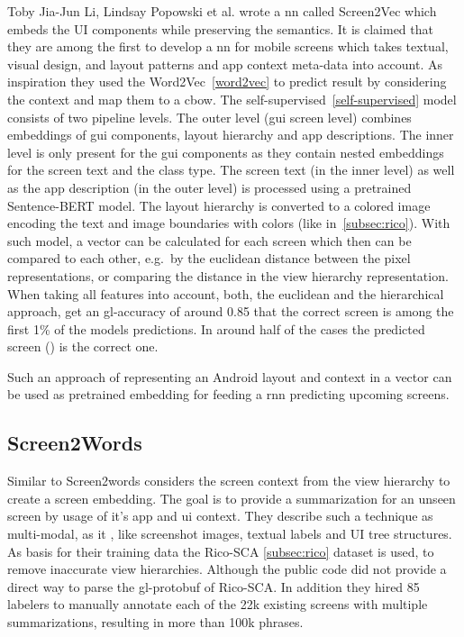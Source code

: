 Toby Jia-Jun Li, Lindsay Popowski et al. \cite{li2021screen2vec} wrote a \gls{nn} called Screen2Vec which embeds the UI components while preserving the semantics.
It is claimed that they are among the first to develop a \gls{nn} for mobile screens which takes textual, visual design, and layout patterns and app context meta-data into account.
As inspiration they used the Word2Vec~\ref{word2vec} to predict result by considering the context and map them to a \gls{cbow}.
The self-supervised~\ref{self-supervised} model consists of two pipeline levels.
The outer level (\gls{gui} screen level) combines embeddings of \gls{gui} components, layout hierarchy and app descriptions.
The inner level is only present for the \gls{gui} components as they contain nested embeddings for the screen text and the class type.
The screen text (in the inner level) as well as the app description (in the outer level) is processed using a pretrained Sentence-BERT model.
The layout hierarchy is converted to a colored image encoding the text and image boundaries with colors (like in~\ref{subsec:rico}).
With such model, a vector can be calculated for each screen which then can be compared to each other, e.g.\ by the euclidean distance between the pixel representations, or comparing the distance in the view hierarchy representation.
When taking all features into account, both, the euclidean and the hierarchical approach, get an \gls{gl-accuracy} of around 0.85 that the correct screen is among the first 1\% of the models predictions.
In around half of the cases the predicted screen () is the correct one.

Such an approach of representing an Android layout and context in a vector can be used as pretrained embedding for feeding a \gls{rnn} predicting upcoming screens.

\subsection{Screen2Words}
\label{subsec:screen2words}

Similar to \cite{li2021screen2vec} Screen2words considers the screen context from the view hierarchy to create a screen embedding.
The goal is to provide a summarization for an unseen screen by usage of it's app and \gls{ui} context.
They describe such a technique as multi-modal, as it , like screenshot images, textual labels and UI tree structures.
As basis for their training data the Rico-SCA \ref{subsec:rico} dataset is used, to remove inaccurate view hierarchies.
Although the public code did not provide a direct way to parse the \gls{gl-protobuf} of Rico-SCA.
In addition they hired 85 labelers to manually annotate each of the 22k existing screens with multiple summarizations, resulting in more than 100k phrases.

